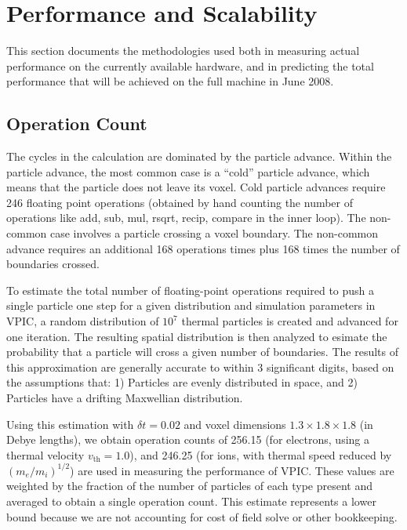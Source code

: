 \documentclass[10pt]{article}
\begin{document}
\section{Performance and Scalability} \label{sec:performance}

This section documents the methodologies used both in measuring actual
performance on the currently available hardware, and in predicting the
total performance that will be achieved on the full machine in June
2008.

\subsection{Operation Count}

The cycles in the calculation are dominated by the particle advance.
Within the particle advance, the most common case is a ``cold''
particle advance, which means that the particle does not leave its
voxel.  Cold particle advances require 246 floating point operations
(obtained by hand counting the number of operations like add, sub,
mul, rsqrt, recip, compare in the inner loop).  The non-common case
involves a particle crossing a voxel boundary.  The non-common advance
requires an additional 168 operations times plus 168 times the number of
boundaries crossed.

To estimate the total number of floating-point operations required to
push a single particle one step for a given distribution and
simulation parameters in VPIC, a random distribution of $10^7$
thermal particles is created and advanced for one iteration.  The
resulting spatial distribution is then analyzed to esimate the
probability that a particle will cross a given number of boundaries.
The results of this approximation are generally accurate to within 3
significant digits, based on the assumptions that: 1) Particles are
evenly distributed in space, and 2) Particles have a drifting
Maxwellian distribution.

Using this estimation with $\delta t = 0.02$ and voxel dimensions $1.3
\times 1.8 \times 1.8$ (in Debye lengths), we obtain operation counts
of 256.15 (for electrons, using a thermal velocity $v_{\mathrm{th}} =
1.0$), and 246.25 (for ions, with thermal speed reduced by
$(m_e/m_i)^{1/2}$) are used in measuring the performance of VPIC.
These values are weighted by the fraction of the number of particles
of each type present and averaged to obtain a single operation count.
This estimate represents a lower bound because we are not accounting
for cost of field solve or other bookkeeping.
\end{document}
